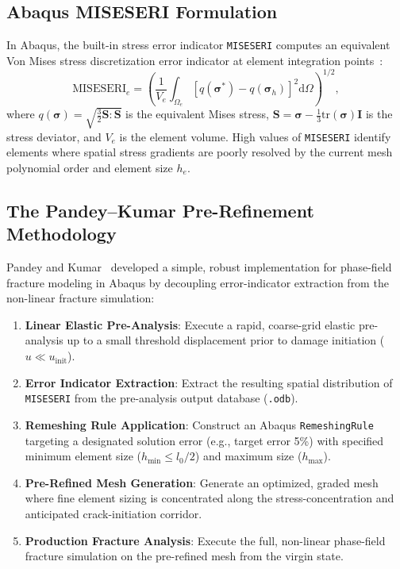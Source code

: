\subsection{Abaqus MISESERI Formulation}
In Abaqus, the built-in stress error indicator \texttt{MISESERI} computes an equivalent Von Mises stress discretization error indicator at element integration points~\cite{abaqus2023}:
\begin{equation}
\label{eq:miseseri_def}
\text{MISESERI}_e = \left( \frac{1}{V_e} \int_{\Omega_e} \left[ q(\boldsymbol{\sigma}^*) - q(\boldsymbol{\sigma}_h) \right]^2 \mathrm{d}\Omega \right)^{1/2},
\end{equation}
where $q(\boldsymbol{\sigma}) = \sqrt{\frac{3}{2}\mathbf{S}:\mathbf{S}}$ is the equivalent Mises stress, $\mathbf{S} = \boldsymbol{\sigma} - \frac{1}{3}\mathrm{tr}(\boldsymbol{\sigma})\mathbf{I}$ is the stress deviator, and $V_e$ is the element volume. High values of \texttt{MISESERI} identify elements where spatial stress gradients are poorly resolved by the current mesh polynomial order and element size $h_e$.

\subsection{The Pandey--Kumar Pre-Refinement Methodology}
Pandey and Kumar~\cite{pandey2025} developed a simple, robust implementation for phase-field fracture modeling in Abaqus by decoupling error-indicator extraction from the non-linear fracture simulation:
\begin{enumerate}
    \item \textbf{Linear Elastic Pre-Analysis}: Execute a rapid, coarse-grid elastic pre-analysis up to a small threshold displacement prior to damage initiation ($u \ll u_{\mathrm{init}}$).
    \item \textbf{Error Indicator Extraction}: Extract the resulting spatial distribution of \texttt{MISESERI} from the pre-analysis output database (\texttt{.odb}).
    \item \textbf{Remeshing Rule Application}: Construct an Abaqus \texttt{RemeshingRule} targeting a designated solution error (e.g., target error 5\%) with specified minimum element size ($h_{\min} \le l_0/2$) and maximum size ($h_{\max}$).
    \item \textbf{Pre-Refined Mesh Generation}: Generate an optimized, graded mesh where fine element sizing is concentrated along the stress-concentration and anticipated crack-initiation corridor.
    \item \textbf{Production Fracture Analysis}: Execute the full, non-linear phase-field fracture simulation on the pre-refined mesh from the virgin state.
\end{enumerate}

